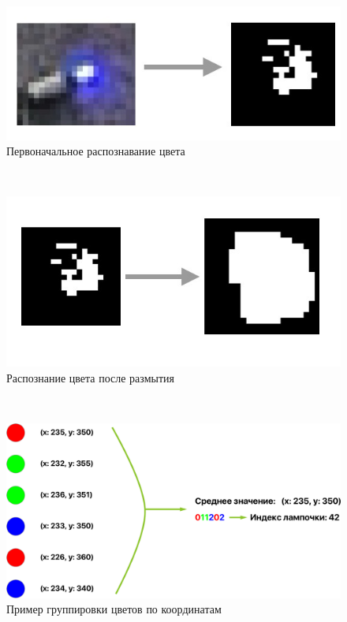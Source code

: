 ~
\begin{figure}[H]
\centering
	\includegraphics[scale=0.5]{figures/calibration/toBlackWhite.jpg}
	\caption{Первоначальное распознавание цвета}
	\label{fig:develop:algorithm:toBlackWhite}
\end{figure}

~
\begin{figure}[H]
\centering
	\includegraphics[scale=0.5]{figures/calibration/blurring.jpg}
	\caption{Распознание цвета после размытия}
	\label{fig:develop:algorithm:blurring}
\end{figure}

~
\begin{figure}[H]
\centering
	\includegraphics[scale=0.35]{figures/calibration/grouping.pdf}
	\caption{Пример группировки цветов по координатам}
	\label{fig:develop:algorithm:grouping}
\end{figure}

